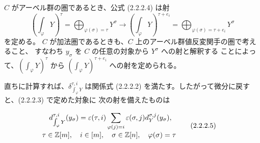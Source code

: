 $C$ がアーベル群の圏であるとき、公式 (2.2.2.4) は射
\[
  \left(\int_\varphi Y\right)^\tau
  =\bigoplus_{\varphi(\sigma)=\tau}Y^\sigma
  \longrightarrow
  \left(\int_\varphi Y\right)^{\tau+e_i}
  =\bigoplus_{\varphi(\sigma)=\tau+e_i}Y^\sigma
\]
を定める。
$C$ が加法圏であるときも、$C$ 上のアーベル群値反変関手の圏で考えること、
すなわち $y_\sigma$ を $C$ の任意の対象から $Y^\sigma$ への射と解釈する
ことによって、$\left(\int_\varphi Y\right)^\tau$ から
$\left(\int_\varphi Y\right)^{\tau+e_i}$ への射を定められる。

直ちに計算すれば、$\delta_{\int_\varphi Y}^{\tau,i}$ は関係式
(2.2.2.2) を満たす。したがって微分に戻すと、(2.2.2.3) で定めた対象に
次の射を備えたものは

\begin{equation}
  \begin{aligned}
    d_{\int_\varphi Y}^{\tau,i}(y_\sigma)
      &=\varepsilon(\tau,i)
        \sum_{\varphi(j)=i}
          \varepsilon(\sigma,j)d_Y^{\sigma,j}(y_\sigma),\\[-1mm]
    &\hspace{-18mm}
      \tau\in\mathbb Z[m],\quad i\in[m],\quad
      \sigma\in\mathbb Z[n],\quad\varphi(\sigma)=\tau
  \end{aligned}
  \tag{2.2.2.5}
\end{equation}
